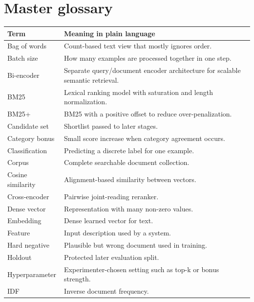 \documentclass[11pt,oneside]{report}
\begin{document}
\chapter*{Master glossary}
\begin{longtable}{p{}p{}}
\toprule
\textbf{Term} & \textbf{Meaning in plain language} \\ \midrule
Bag of words & Count-based text view that mostly ignores order. \\ \midrule
Batch size & How many examples are processed together in one step. \\ \midrule
Bi-encoder & Separate query/document encoder architecture for scalable semantic retrieval. \\ \midrule
BM25 & Lexical ranking model with saturation and length normalization. \\ \midrule
BM25+ & BM25 with a positive offset to reduce over-penalization. \\ \midrule
Candidate set & Shortlist passed to later stages. \\ \midrule
Category bonus & Small score increase when category agreement occurs. \\ \midrule
Classification & Predicting a discrete label for one example. \\ \midrule
Corpus & Complete searchable document collection. \\ \midrule
Cosine similarity & Alignment-based similarity between vectors. \\ \midrule
Cross-encoder & Pairwise joint-reading reranker. \\ \midrule
Dense vector & Representation with many non-zero values. \\ \midrule
Embedding & Dense learned vector for text. \\ \midrule
Feature & Input description used by a system. \\ \midrule
Hard negative & Plausible but wrong document used in training. \\ \midrule
Holdout & Protected later evaluation split. \\ \midrule
Hyperparameter & Experimenter-chosen setting such as top-k or bonus strength. \\ \midrule
IDF & Inverse document frequency. \\ \midrule
\bottomrule
\end{longtable}
\end{document}
